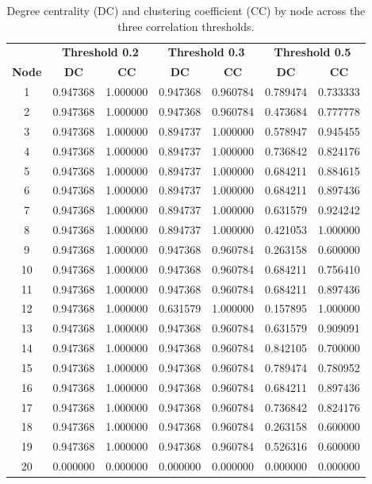 \documentclass[11pt]{article}
\begin{document}
\begin{table}[H]
  \centering
  \small
  \caption{Degree centrality (DC) and clustering coefficient (CC) by node across the three correlation thresholds.}
  \label{tab:dcall}
  \begin{tabular}{@{}c cc cc cc@{}}
    \toprule
    & \multicolumn{2}{c}{\textbf{Threshold 0.2}} & \multicolumn{2}{c}{\textbf{Threshold 0.3}} & \multicolumn{2}{c}{\textbf{Threshold 0.5}} \\
    \textbf{Node} & \textbf{DC} & \textbf{CC} & \textbf{DC} & \textbf{CC} & \textbf{DC} & \textbf{CC} \\
    \midrule
    1  & 0.947368 & 1.000000 & 0.947368 & 0.960784 & 0.789474 & 0.733333 \\
    2  & 0.947368 & 1.000000 & 0.947368 & 0.960784 & 0.473684 & 0.777778 \\
    3  & 0.947368 & 1.000000 & 0.894737 & 1.000000 & 0.578947 & 0.945455 \\
    4  & 0.947368 & 1.000000 & 0.894737 & 1.000000 & 0.736842 & 0.824176 \\
    5  & 0.947368 & 1.000000 & 0.894737 & 1.000000 & 0.684211 & 0.884615 \\
    6  & 0.947368 & 1.000000 & 0.894737 & 1.000000 & 0.684211 & 0.897436 \\
    7  & 0.947368 & 1.000000 & 0.894737 & 1.000000 & 0.631579 & 0.924242 \\
    8  & 0.947368 & 1.000000 & 0.894737 & 1.000000 & 0.421053 & 1.000000 \\
    9  & 0.947368 & 1.000000 & 0.947368 & 0.960784 & 0.263158 & 0.600000 \\
    10 & 0.947368 & 1.000000 & 0.947368 & 0.960784 & 0.684211 & 0.756410 \\
    11 & 0.947368 & 1.000000 & 0.947368 & 0.960784 & 0.684211 & 0.897436 \\
    12 & 0.947368 & 1.000000 & 0.631579 & 1.000000 & 0.157895 & 1.000000 \\
    13 & 0.947368 & 1.000000 & 0.947368 & 0.960784 & 0.631579 & 0.909091 \\
    14 & 0.947368 & 1.000000 & 0.947368 & 0.960784 & 0.842105 & 0.700000 \\
    15 & 0.947368 & 1.000000 & 0.947368 & 0.960784 & 0.789474 & 0.780952 \\
    16 & 0.947368 & 1.000000 & 0.947368 & 0.960784 & 0.684211 & 0.897436 \\
    17 & 0.947368 & 1.000000 & 0.947368 & 0.960784 & 0.736842 & 0.824176 \\
    18 & 0.947368 & 1.000000 & 0.947368 & 0.960784 & 0.263158 & 0.600000 \\
    19 & 0.947368 & 1.000000 & 0.947368 & 0.960784 & 0.526316 & 0.600000 \\
    20 & 0.000000 & 0.000000 & 0.000000 & 0.000000 & 0.000000 & 0.000000 \\
    \bottomrule
  \end{tabular}
\end{table}
\end{document}
